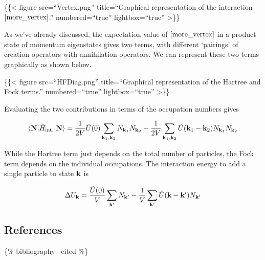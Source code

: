 \{\{\textless{} figure src=``Vertex.png'' title=``Graphical
representation of the interaction \(\eqref{more_vertex}\).''
numbered=``true'' lightbox=``true'' \textgreater\}\}

As we've already discussed, the expectation value of
\(\eqref{more_vertex}\) in a product state of momentum eigenstates gives
two terms, with different `pairings' of creation operators with
annihilation operators. We can represent these two terms graphically as
shown below.

\{\{\textless{} figure src=``HFDiag.png'' title=``Graphical
representation of the Hartree and Fock terms.'' numbered=``true''
lightbox=``true'' \textgreater\}\}

Evaluating the two contributions in terms of the occupation numbers
gives

\[
\langle{\mathbf{N}}\rvert \hat H_\text{int.} \lvert \mathbf{N} \rangle = \frac{1}{2V}\tilde U(0) \sum_{\mathbf{k}_1,\mathbf{k}_2} N_{\mathbf{k}_1}N_{\mathbf{k}_2} - \frac{1}{2V} \sum_{\mathbf{k}_1,\mathbf{k}_2} \tilde U(\mathbf{k}_1-\mathbf{k}_2) N_{\mathbf{k}_1}N_{\mathbf{k}_2}
\]

While the Hartree term just depends on the total number of particles,
the Fock term depends on the individual occupations. The interaction
energy to add a single particle to state \(\mathbf{k}\) is

\[
\Delta U_{\mathbf{k}} = \frac{\tilde U(0)}{V} \sum_{\mathbf{k}'} N_{\mathbf{k}'} - \frac{1}{V}\sum_{\mathbf{k}'} \tilde U(\mathbf{k}-\mathbf{k}') N_{\mathbf{k}'}
\]

\hypertarget{references}{%
\subsection{References}\label{references}}

\{\% bibliography --cited \%\}
